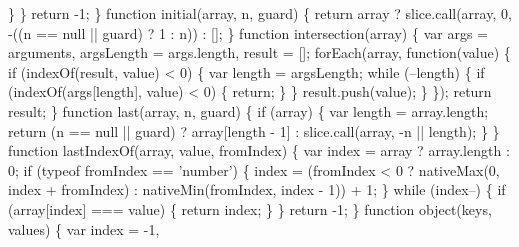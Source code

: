 \begin{DoxyCodeInclude}
{{\textcolor{stringliteral}{      \}}
\textcolor{stringliteral}{    \}}
\textcolor{stringliteral}{    return -1;}
\textcolor{stringliteral}{  \}}
\textcolor{stringliteral}{}
\textcolor{stringliteral}{  function initial(array, n, guard) \{}
\textcolor{stringliteral}{    return array}
\textcolor{stringliteral}{      ? slice.call(array, 0, -((n == null || guard) ? 1 : n))}
\textcolor{stringliteral}{      : [];}
\textcolor{stringliteral}{  \}}
\textcolor{stringliteral}{}
\textcolor{stringliteral}{  function intersection(array) \{}
\textcolor{stringliteral}{    var args = arguments,}
\textcolor{stringliteral}{        argsLength = args.length,}
\textcolor{stringliteral}{        result = [];}
\textcolor{stringliteral}{}
\textcolor{stringliteral}{    forEach(array, function(value) \{}
\textcolor{stringliteral}{      if (indexOf(result, value) < 0) \{}
\textcolor{stringliteral}{        var length = argsLength;}
\textcolor{stringliteral}{        while (--length) \{}
\textcolor{stringliteral}{          if (indexOf(args[length], value) < 0) \{}
\textcolor{stringliteral}{            return;}
\textcolor{stringliteral}{          \}}
\textcolor{stringliteral}{        \}}
\textcolor{stringliteral}{        result.push(value);}
\textcolor{stringliteral}{      \}}
\textcolor{stringliteral}{    \});}
\textcolor{stringliteral}{    return result;}
\textcolor{stringliteral}{  \}}
\textcolor{stringliteral}{}
\textcolor{stringliteral}{  function last(array, n, guard) \{}
\textcolor{stringliteral}{    if (array) \{}
\textcolor{stringliteral}{      var length = array.length;}
\textcolor{stringliteral}{      return (n == null || guard) ? array[length - 1] : slice.call(array, -n || length);}
\textcolor{stringliteral}{    \}}
\textcolor{stringliteral}{  \}}
\textcolor{stringliteral}{}
\textcolor{stringliteral}{  function lastIndexOf(array, value, fromIndex) \{}
\textcolor{stringliteral}{    var index = array ? array.length : 0;}
\textcolor{stringliteral}{    if (typeof fromIndex == 'number') \{}
\textcolor{stringliteral}{      index = (fromIndex < 0 ? nativeMax(0, index + fromIndex) : nativeMin(fromIndex, index - 1)) + 1;}
\textcolor{stringliteral}{    \}}
\textcolor{stringliteral}{    while (index--) \{}
\textcolor{stringliteral}{      if (array[index] === value) \{}
\textcolor{stringliteral}{        return index;}
\textcolor{stringliteral}{      \}}
\textcolor{stringliteral}{    \}}
\textcolor{stringliteral}{    return -1;}
\textcolor{stringliteral}{  \}}
\textcolor{stringliteral}{}
\textcolor{stringliteral}{  function object(keys, values) \{}
\textcolor{stringliteral}{    var index = -1,}
}}
\end{DoxyCodeInclude}

